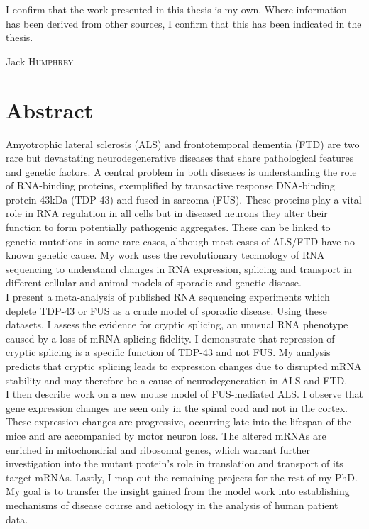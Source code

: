 

I confirm that the work presented in this thesis is my own.  Where information has been derived from other sources, I confirm that this has been indicated in the thesis.

Jack \textsc{Humphrey}
\vfill




\cleardoublepage

\section*{Abstract}

Amyotrophic lateral sclerosis (ALS) and frontotemporal dementia (FTD) are two rare but devastating neurodegenerative diseases that share pathological features and genetic factors. A central problem in  both diseases is understanding the role of RNA-binding proteins, exemplified by transactive response DNA-binding protein 43kDa (TDP-43) and fused in sarcoma (FUS). These proteins play a vital role in RNA regulation in all cells but in diseased neurons they alter their function to form potentially pathogenic aggregates. These can be linked to genetic mutations in some rare cases, although most cases of ALS/FTD have no known genetic cause. My work uses the revolutionary technology of RNA sequencing to understand changes in RNA expression, splicing and transport in different cellular and animal models of sporadic and genetic disease.\\
I present a meta-analysis of published RNA sequencing experiments which deplete TDP-43 or FUS as a crude model of sporadic disease. Using these datasets, I assess the evidence for cryptic splicing, an unusual RNA phenotype caused by a loss of mRNA splicing fidelity. I demonstrate that repression of cryptic splicing is a specific function of TDP-43 and not FUS. My analysis predicts that cryptic splicing leads to expression changes due to disrupted mRNA stability and may therefore be a cause of neurodegeneration in ALS and FTD.\\ 
I then describe work on a new mouse model of FUS-mediated ALS. I observe that gene expression changes are seen only in the spinal cord and not in the cortex. These expression changes are progressive, occurring late into the lifespan of the mice and are accompanied by motor neuron loss. The altered mRNAs are enriched in mitochondrial and ribosomal genes, which warrant further investigation into the mutant protein's role in translation and transport of its target mRNAs. 
Lastly, I map out the remaining projects for the rest of my PhD. My goal is to transfer the insight gained from the model work into establishing mechanisms of disease course and aetiology in the analysis of human patient data. 






